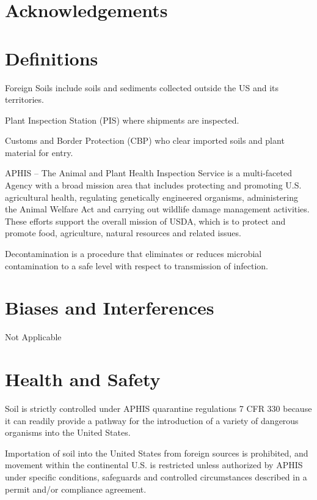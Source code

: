 \documentclass[12pt]{../SOP3}\usepackage[]{graphicx}\usepackage[]{color}
\begin{document}
\tableofcontents

\newpage

\section{Acknowledgements}

\section{Definitions}

\NP Foreign Soils include soils and sediments collected outside the US and its territories.

\NP Plant Inspection Station (PIS) where shipments are inspected.

\NP Customs and Border Protection (CBP) who clear imported soils and plant material for entry.  

\NP APHIS -- The Animal and Plant Health Inspection Service is a multi-faceted Agency with a broad mission area that includes protecting and promoting U.S. agricultural health, regulating genetically engineered organisms, administering the Animal Welfare Act and carrying out wildlife damage management activities. These efforts support the overall mission of USDA, which is to protect and promote food, agriculture, natural resources and related issues.

\NP Decontamination is a procedure that eliminates or reduces microbial contamination to a
safe level with respect to transmission of infection.

\section{Biases and Interferences}

\NP Not Applicable

\section{Health and Safety}

\NP Soil is strictly controlled under APHIS quarantine regulations 7 CFR 330 because it can readily provide a pathway for the introduction of a variety of dangerous organisms into the United States.

\NP Importation of soil into the United States from foreign sources is prohibited, and movement within the continental U.S. is restricted unless authorized by APHIS under specific conditions, safeguards and controlled circumstances described in a permit and/or compliance agreement.
\end{document}

